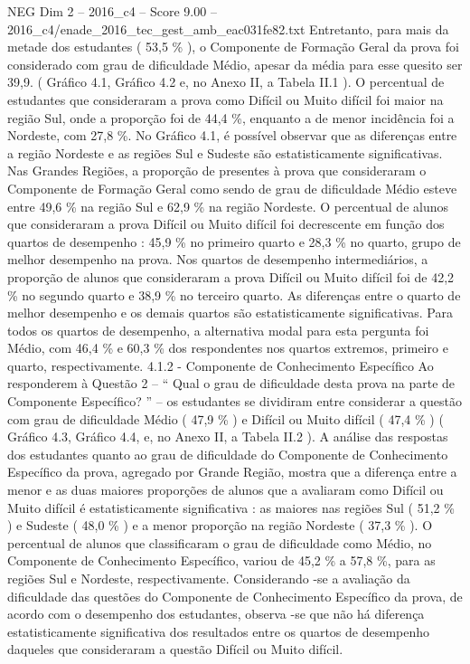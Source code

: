 \begin{textsample}{NEG Dim 2 – 2016\_c4 – Score 9.00 – 2016\_c4/enade\_2016\_tec\_gest\_amb\_eac031fe82.txt}
Entretanto, para mais da metade dos estudantes ( 53,5 \% ), o Componente de Formação Geral da prova foi considerado com grau de dificuldade Médio, apesar da média para esse quesito ser 39,9. ( Gráfico 4.1, Gráfico 4.2 e, no Anexo II, a Tabela II.1 ).
O percentual de estudantes que consideraram a prova como Difícil ou Muito difícil foi maior na região Sul, onde a proporção foi de 44,4 \%, enquanto a de menor incidência foi a Nordeste, com 27,8 \%.
No Gráfico 4.1, é possível observar que as diferenças entre a região Nordeste e as regiões Sul e Sudeste são estatisticamente significativas.
Nas Grandes Regiões, a proporção de presentes à prova que consideraram o Componente de Formação Geral como sendo de grau de dificuldade Médio esteve entre 49,6 \% na região Sul e 62,9 \% na região Nordeste.
O percentual de alunos que consideraram a prova Difícil ou Muito difícil foi decrescente em função dos quartos de desempenho : 45,9 \% no primeiro quarto e 28,3 \% no quarto, grupo de melhor desempenho na prova.
Nos quartos de desempenho intermediários, a proporção de alunos que consideraram a prova Difícil ou Muito difícil foi de 42,2 \% no segundo quarto e 38,9 \% no terceiro quarto.
As diferenças entre o quarto de melhor desempenho e os demais quartos são estatisticamente significativas.
Para todos os quartos de desempenho, a alternativa modal para esta pergunta foi Médio, com 46,4 \% e 60,3 \% dos respondentes nos quartos extremos, primeiro e quarto, respectivamente. 4.1.2 - Componente de Conhecimento Específico Ao responderem à Questão 2 – “ Qual o grau de dificuldade desta prova na parte de Componente Específico? ” – os estudantes se dividiram entre considerar a questão com grau de dificuldade Médio ( 47,9 \% ) e Difícil ou Muito difícil ( 47,4 \% ) ( Gráfico 4.3, Gráfico 4.4, e, no Anexo II, a Tabela II.2 ).
A análise das respostas dos estudantes quanto ao grau de dificuldade do Componente de Conhecimento Específico da prova, agregado por Grande Região, mostra que a diferença entre a menor e as duas maiores proporções de alunos que a avaliaram como Difícil ou Muito difícil é estatisticamente significativa : as maiores nas regiões Sul ( 51,2 \% ) e Sudeste ( 48,0 \% ) e a menor proporção na região Nordeste ( 37,3 \% ).
O percentual de alunos que classificaram o grau de dificuldade como Médio, no Componente de Conhecimento Específico, variou de 45,2 \% a 57,8 \%, para as regiões Sul e Nordeste, respectivamente.
Considerando -se a avaliação da dificuldade das questões do Componente de Conhecimento Específico da prova, de acordo com o desempenho dos estudantes, observa -se que não há diferença estatisticamente significativa dos resultados entre os quartos de desempenho daqueles que consideraram a questão Difícil ou Muito difícil.

\end{textsample}
